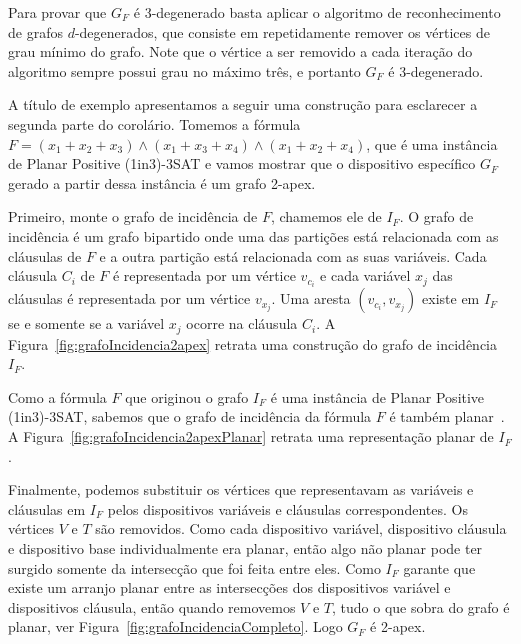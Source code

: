 Para provar que $G_F$ é 3-degenerado basta aplicar o algoritmo de reconhecimento de grafos $d$-degenerados, que consiste em repetidamente remover os vértices de grau mínimo do grafo. Note que o vértice a ser removido a cada iteração do algoritmo sempre possui grau no máximo três, e portanto $G_F$ é 3-degenerado.

A título de exemplo apresentamos a seguir uma construção para esclarecer a segunda parte do corolário. Tomemos a fórmula $F=(x_1+x_2+x_3)\wedge(x_1+x_3+x_4)\wedge(x_1+x_2+x_4)$, que  é uma instância de {\sc Planar Positive (1in3)-3SAT} e vamos mostrar que o dispositivo específico $G_F$ gerado a partir dessa instância é um grafo 2-apex.

Primeiro, monte o grafo de incidência de $F$, chamemos ele de $I_F$. O grafo de incidência é um grafo bipartido onde uma das partições está relacionada com as cláusulas de $F$ e a outra partição está relacionada com as suas variáveis. Cada cláusula $C_i$ de $F$ é representada por um vértice $v_{c_i}$ e cada variável $x_j$ das cláusulas é representada por um vértice $v_{x_j}$. Uma aresta  $(v_{c_i}, v_{x_j})$ existe em $I_F$ se e somente se a variável $x_j$ ocorre na cláusula $C_i$. A Figura~\ref{fig:grafoIncidencia2apex} retrata uma construção do grafo de incidência $I_F$.



Como a fórmula $F$ que originou o grafo $I_F$ é uma instância de {\sc Planar Positive (1in3)-3SAT}, sabemos que o grafo de incidência da fórmula  $F$ é também planar~\cite{mulzer2008minimum}. A Figura~\ref{fig:grafoIncidencia2apexPlanar} retrata uma representação planar de $I_F$.




Finalmente, podemos substituir os vértices que representavam as variáveis e cláusulas em $I_F$ pelos dispositivos variáveis e cláusulas correspondentes. Os vértices $V$ e $T$ são removidos. Como cada dispositivo variável, dispositivo cláusula e dispositivo base individualmente era planar, então algo não planar pode ter surgido somente da intersecção que foi feita entre eles. Como $I_F$ garante que existe um arranjo planar entre as intersecções dos dispositivos variável e dispositivos cláusula, então quando removemos $V$ e $T$, tudo o que sobra do grafo é planar, ver Figura~\ref{fig:grafoIncidenciaCompleto}. Logo $G_F$ é 2-apex.


